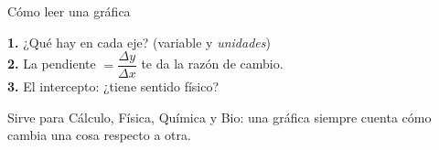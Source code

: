 \documentclass[12pt]{article}
\begin{document}
\begin{mwcarlamina}{Cómo leer una gráfica}
\begin{cajapasos}
  \small
  \textbf{1.} ¿Qué hay en cada eje? (variable y \emph{unidades})\\[3pt]
  \textbf{2.} La pendiente $= \dfrac{\Delta y}{\Delta x}$ te da la
  razón de cambio.\\[3pt]
  \textbf{3.} El intercepto: ¿tiene sentido físico?
\end{cajapasos}
\begin{cajateoria}
  \small Sirve para Cálculo, Física, Química y Bio: una gráfica
  siempre cuenta cómo cambia una cosa respecto a otra.
\end{cajateoria}
\end{mwcarlamina}

\end{document}
